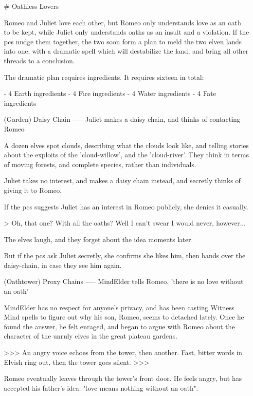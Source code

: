 # Oathless Lovers

Romeo and Juliet love each other, but Romeo only understands love as an oath to be kept, while Juliet only understands oaths as an insult and a violation.
If the \glspl{pc} nudge them together, the two soon form a plan to meld the two elven lands into one, with a dramatic spell which will destabilize the land, and bring all other threads to a conclusion.

The dramatic plan
requires \glspl{ingredient}.
It requires sixteen in total:

- 4 Earth \glspl{ingredient}
- 4 Fire \glspl{ingredient}
- 4 Water \glspl{ingredient}
- 4 Fate \glspl{ingredient}

(Garden) Daisy Chain
-----
{Juliet makes a daisy chain, and thinks of contacting Romeo}

A dozen elves spot clouds, describing what the clouds look like, and telling stories about the exploits of the 'cloud-willow', and the 'cloud-river'.
They think in terms of moving forests, and complete species, rather than individuals.

Juliet takes no interest, and makes a daisy chain instead, and secretly thinks of giving it to Romeo.

If the \glspl{pc} suggests Juliet has an interest in Romeo publicly,
she denies it casually.

> Oh, that one?  With all the oaths?  Well I can't swear I would never, however...

The elves laugh, and they forget about the idea moments later.

But if the \glspl{pc} ask Juliet secretly,
she confirms she likes him, then hands over the daisy-chain, in case they see him again.

(Oathtower) Proxy Chains
-----
{MindElder tells Romeo, 'there is no love without an oath'}

MindElder has no respect for anyone's privacy, and has been casting Witness Mind spells to figure out why his son, Romeo, seems to detached lately.
Once he found the answer, he felt enraged, and began to argue with Romeo about the character of the unruly elves in the great plateau gardens.

>>>
An angry voice echoes from the tower, then another.
Fast, bitter words in Elvish ring out, then the tower goes silent.
>>>

Romeo eventually leaves through the tower's front door.
He feels angry, but has accepted his father's idea: "love means nothing without an oath".

